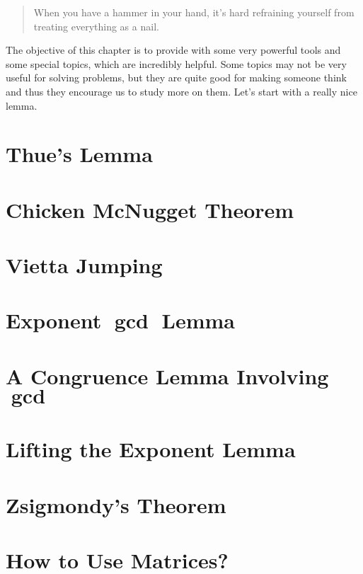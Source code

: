 \documentclass{subfile}
\begin{document}
	\begin{quote}\ttfamily
		When you have a hammer in your hand, it's hard refraining yourself from treating everything as a nail.
	\end{quote}
	The objective of this chapter is to provide with some very powerful tools and some special topics, which are incredibly helpful. Some topics may not be very useful for solving problems, but they are quite good for making someone think and thus they encourage us to study more on them. Let's start with a really nice lemma.
	
	\section{Thue's Lemma}
	
	
	\section{Chicken McNugget Theorem}
	
	
	\section{Vietta Jumping}
	
	
	\section{Exponent \texorpdfstring{$\boldsymbol{\gcd}$}{gcd} Lemma}
	
	
	\section{A Congruence Lemma Involving \texorpdfstring{$\boldsymbol{\gcd}$}{gcd}}
	
	
	\section{Lifting the Exponent Lemma}
	
	
	\section{Zsigmondy's Theorem}

	
		
	\section{How to Use Matrices?}
		
\end{document}
